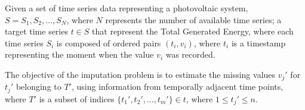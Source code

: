 \begin{definition}

	Given a set of time series data representing a photovoltaic system, $S = {S_1, S_2, \ldots, S_N}$, where $N$ represents the number of available time series;
	a target time series $t \in S$ that represent the Total Generated Energy, where each time series $S_i$ is composed of ordered pairs $(t_i, v_i)$, where $t_i$ is
	a timestamp representing the moment when the value $v_i$ was recorded.

	The objective of the imputation problem is to estimate the missing values $v_j'$ for $t_j'$ belonging to $T'$, using information from temporally adjacent time points, where $T'$ is a subset of indices $\{t_1', t_2', ..., t_m'\} \in t$, where $1 \le t_j' \le n$.

\end{definition}

